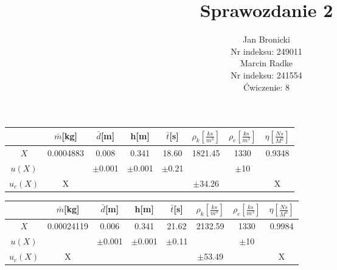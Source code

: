 \documentclass{article}
\title{Sprawozdanie 2}
\author{Jan Bronicki \\
Nr indeksu: 249011\\
Marcin Radke\\
Nr indeksu: 241554\\
Ćwiczenie: 8}
\date{}
\begin{document}
\maketitle
\renewcommand{\arraystretch}{1.3}
\begin{tabular}{|c|c|c|c|c|c|c|c|}
    \hline
    &$\bar{m}$[kg]&$\bar{d}$[m]&h[m]&$\bar{t}$[s]&$\rho_{k}\left[\frac{ks}{m^{3}}\right]$&$\rho_{c}$$\left[\frac{ks}{m^{3}}\right]$&$\eta\left[\frac{Ns}{M^{2}}\right]$\\
    \hline 
    $X$ &0.0004883&0.008&0.341&18.60&1821.45&1330&0.9348\\\hline
    $u(X)$&\cellcolor{gray}&$\pm$0.001&$\pm$0.001&$\pm$0.21&\cellcolor{gray}&$\pm$10&\cellcolor{gray}    \\\hline
    $u_{c}(X)$&X&\cellcolor{gray}&\cellcolor{gray}&\cellcolor{gray}&$\pm$34.26&\cellcolor{gray}&X\\\hline
\end{tabular}

\begin{tabular}{|c|c|c|c|c|c|c|c|}
    \hline
    \cellcolor{gray!50}&\cellcolor{gray!50}$\bar{m}$[kg]&\cellcolor{gray!50}$\bar{d}$[m]&\cellcolor{gray!50}h[m]&\cellcolor{gray!50}$\bar{t}$[s]&\cellcolor{gray!50}$\rho_{k}\left[\frac{ks}{m^{3}}\right]$&\cellcolor{gray!50}$\rho_{c}$$\left[\frac{ks}{m^{3}}\right]$&\cellcolor{gray!50}$\eta\left[\frac{Ns}{M^{2}}\right]$\\
    \hline 
    \cellcolor{gray!50}$X$ &\cellcolor{gray!50}0.00024119&\cellcolor{gray!50}0.006&\cellcolor{gray!50}0.341&\cellcolor{gray!50}21.62&\cellcolor{gray!50}2132.59&\cellcolor{gray!50}1330&\cellcolor{gray!50}0.9984\\\hline
    \cellcolor{gray!50}$u(X)$&\cellcolor{gray}&\cellcolor{gray!50}$\pm$0.001&\cellcolor{gray!50}$\pm$0.001&\cellcolor{gray!50}$\pm$0.11&\cellcolor{gray}&\cellcolor{gray!50}$\pm$10&\cellcolor{gray}    \\\hline
    \cellcolor{gray!50}$u_{c}(X)$&\cellcolor{gray!50}X&\cellcolor{gray}&\cellcolor{gray}&\cellcolor{gray}&\cellcolor{gray!50}$\pm$53.49&\cellcolor{gray}&\cellcolor{gray!50}X\\\hline
\end{tabular}
\end{document}

